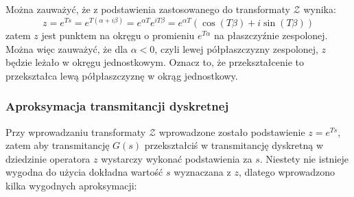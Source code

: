 \documentclass{article}
\begin{document}
        Można zauważyć, że z podstawienia zastosowanego do transformaty $\mathcal{Z}$ wynika:
        $$
            z = e^{Ts} = e^{T(\alpha + i\beta)} = e^{\alpha T}e^{iT\beta} = e^{\alpha T} \left( \cos{(T\beta)} + i \sin{(T\beta)} \right)
        $$
        zatem $z$ jest punktem na okręgu o promieniu $e^{T\alpha}$ na płaszczyźnie zespolonej.
        Można więc zauważyć, że dla $\alpha < 0$, czyli lewej półpłaszczyzny zespolonej, $z$ będzie leżało w okręgu jednostkowym.
        Oznacz to, że przekształcenie to przekształca lewą półpłaszczyznę w okrąg jednostkowy.

        \subsubsection{Aproksymacja transmitancji dyskretnej}
        Przy wprowadzaniu transformaty $\mathcal{Z}$  wprowadzone zostało podstawienie $z = e^{Ts}$, zatem aby transmitancję $G(s)$ przekształciś w transmitancję dyskretną w dziedzinie operatora $z$ wystarczy wykonać podstawienia za $s$.
        Niestety nie istnieje wygodna do użycia dokładna wartość $s$ wyznaczana z $z$, dlatego wprowadzono kilka wygodnych aproksymacji:
\end{document}

